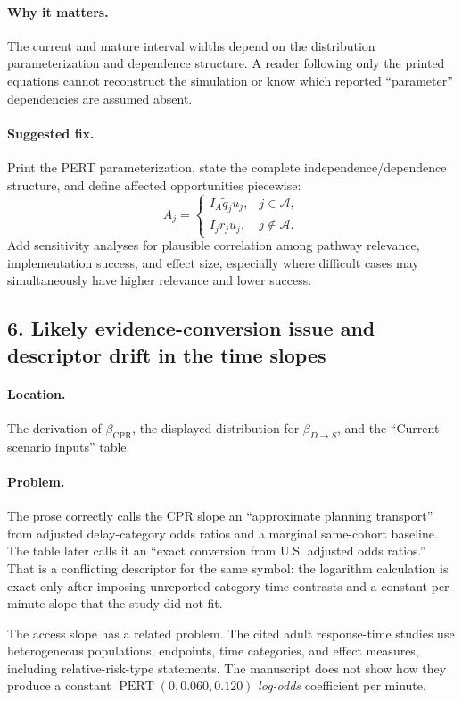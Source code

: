 \documentclass[11pt]{article}
\begin{document}
\paragraph{Why it matters.}
The current and mature interval widths depend on the distribution
parameterization and dependence structure.  A reader following only the
printed equations cannot reconstruct the simulation or know which reported
``parameter'' dependencies are assumed absent.

\paragraph{Suggested fix.}
Print the PERT parameterization, state the complete independence/dependence
structure, and define affected opportunities piecewise:
\[
A_j=
\begin{cases}
I_A\tilde q_ju_j,&j\in\mathcal A,\\
I_jr_ju_j,&j\notin\mathcal A.
\end{cases}
\]
Add sensitivity analyses for plausible correlation among pathway relevance,
implementation success, and effect size, especially where difficult cases may
simultaneously have higher relevance and lower success.

\subsection*{6. Likely evidence-conversion issue and descriptor drift in the time slopes}

\paragraph{Location.}
The derivation of $\beta_{\mathrm{CPR}}$, the displayed distribution for
$\beta_{D\to S}$, and the ``Current-scenario inputs'' table.

\paragraph{Problem.}
The prose correctly calls the CPR slope an ``approximate planning transport''
from adjusted delay-category odds ratios and a marginal same-cohort baseline.
The table later calls it an ``exact conversion from U.S. adjusted odds
ratios.''  That is a conflicting descriptor for the same symbol: the logarithm
calculation is exact only after imposing unreported category-time contrasts
and a constant per-minute slope that the study did not fit.

The access slope has a related problem.  The cited adult response-time studies
use heterogeneous populations, endpoints, time categories, and effect
measures, including relative-risk-type statements.  The manuscript does not
show how they produce a constant
$\operatorname{PERT}(0,0.060,0.120)$ \emph{log-odds} coefficient per minute.
\end{document}
